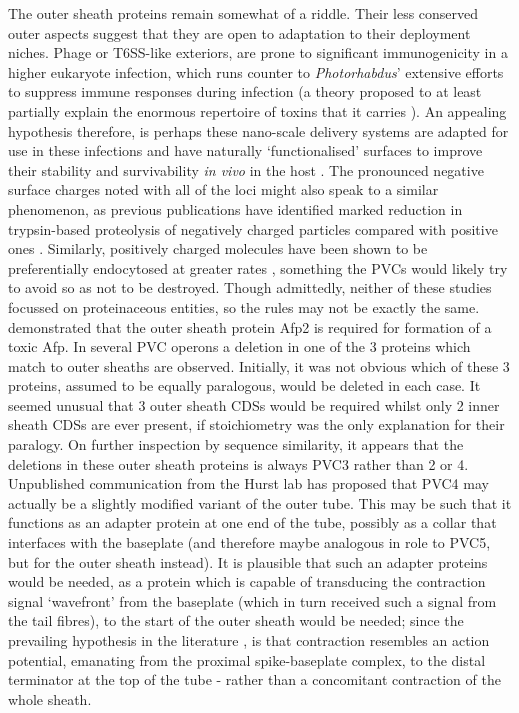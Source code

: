 The outer sheath proteins remain somewhat of a riddle. Their less conserved outer aspects suggest that they are open to adaptation to their deployment niches. Phage or T6SS-like exteriors, are prone to significant immunogenicity in a higher eukaryote infection, which runs counter to \emph{Photorhabdus}' extensive efforts to suppress immune responses during infection (a theory proposed to at least partially explain the enormous repertoire of toxins that it carries \citep{Eleftherianos2010}). An appealing hypothesis therefore, is perhaps these nano-scale delivery systems are adapted for use in these infections and have naturally `functionalised' surfaces to improve their stability and survivability \emph{in vivo} in the host \citep{DelTordello2016, Kaur2012}. The pronounced negative surface charges noted with all of the loci might also speak to a similar phenomenon, as previous publications have identified marked reduction in trypsin-based proteolysis of negatively charged particles compared with positive ones \citep{Liu1992}. Similarly, positively charged molecules have been shown to be preferentially endocytosed at greater rates \citep{Chung2007}, something the PVCs would likely try to avoid so as not to be destroyed. Though admittedly, neither of these studies focussed on proteinaceous entities, so the rules may not be exactly the same. \cite{Hurst2004} demonstrated that the outer sheath protein Afp2 is required for formation of a toxic Afp. In several PVC operons a deletion in one of the 3 proteins which match to outer sheaths are observed. Initially, it was not obvious which of these 3 proteins, assumed to be equally paralogous, would be deleted in each case. It seemed unusual that 3 outer sheath CDSs would be required whilst only 2 inner sheath CDSs are ever present, if stoichiometry was the only explanation for their paralogy. On further inspection by sequence similarity, it appears that the deletions in these outer sheath proteins is always PVC3 rather than 2 or 4. Unpublished communication from the Hurst lab has proposed that PVC4 may actually be a slightly modified variant of the outer tube. This may be such that it functions as an adapter protein at one end of the tube, possibly as a collar that interfaces with the baseplate (and therefore maybe analogous in role to PVC5, but for the outer sheath instead). It is plausible that such an adapter proteins would be needed, as a protein which is capable of transducing the contraction signal `wavefront' from the baseplate (which in turn received such a signal from the tail fibres), to the start of the outer sheath would be needed; since the prevailing hypothesis in the literature \cite{Kube2015}, is that contraction resembles an action potential, emanating from the proximal spike-baseplate complex, to the distal terminator at the top of the tube -  rather than a concomitant contraction of the whole sheath.

